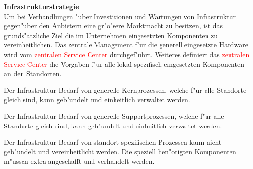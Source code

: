 \textbf{Infrastrukturstrategie}\\
Um bei Verhandlungen "uber Investitionen und Wartungen von Infrastruktur gegen"uber den Anbietern eine gr"o"sere Marktmacht zu besitzen, ist das grunds"atzliche Ziel die im Unternehmen eingesetzten Komponenten zu vereinheitlichen. Das zentrale Management f"ur die generell eingesetzte Hardware wird vom \textcolor{red}{zentralen Service Center} durchgef"uhrt. Weiteres definiert das \textcolor{red}{zentralen Service Center} die Vorgaben f"ur alle lokal-spezifisch eingesetzten Komponenten an den Standorten.

Der Infrastruktur-Bedarf von generelle Kernprozessen, welche f"ur alle Standorte gleich sind, kann geb"undelt und einheitlich verwaltet werden. 

Der Infrastruktur-Bedarf von generelle Supportprozessen, welche f"ur alle Standorte gleich sind, kann geb"undelt und einheitlich verwaltet werden. 

Der Infrastruktur-Bedarf von standort-spezifischen Prozessen kann nicht geb"undelt und vereinheitlicht werden. Die speziell ben"otigten Komponenten m"ussen extra angeschafft und verhandelt werden.

